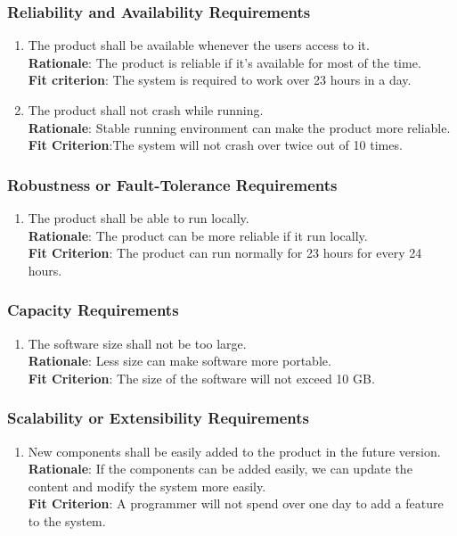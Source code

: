 \documentclass{article}
\begin{document}
\subsubsection{Reliability and Availability Requirements}
\begin{enumerate}[PR4.1]
    \item The product shall be available whenever the users access to it.\\
    \textbf{Rationale}: The product is reliable if it's available for most of the time.\\
    \textbf{Fit criterion}: The system is required to work over 23 hours in a day.
    
    \item The product shall not crash while running.\\
    \textbf{Rationale}: Stable running environment can make the product more reliable.\\
    \textbf{Fit Criterion}:The system will not crash over twice out of 10 times.
\end{enumerate}
\subsubsection{Robustness or Fault-Tolerance Requirements}
\begin{enumerate}[PR5.1]
    \item The product shall be able to run locally.\\
    \textbf{Rationale}: The product can be more reliable if it run locally.\\
    \textbf{Fit Criterion}: The product can run normally for 23 hours for every 24 hours.
\end{enumerate}
\subsubsection{Capacity Requirements}
\begin{enumerate}[PR6.1]
    \item The software size shall not be too large.\\
    \textbf{Rationale}: Less size can make software more portable.\\
    \textbf{Fit Criterion}: The size of the software will not exceed 10 GB.
\end{enumerate}
\subsubsection{Scalability or Extensibility Requirements}
\begin{enumerate}[PR7.1]
    \item New components shall be easily added to the product in the future version.\\
    \textbf{Rationale}: If the components can be added easily, we can update the content and modify the system more easily.\\
    \textbf{Fit Criterion}: A programmer will not spend over one day to add a feature to the system.
\end{enumerate}
\end{document}
